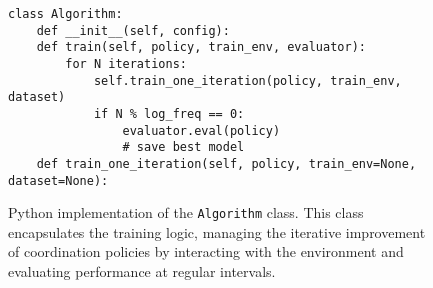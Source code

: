 \begin{figure*}[t]
\centering
\begin{tcolorbox}[title={\begin{pseudo}Algorithm Class\end{pseudo}}, colback=sbOrange025, colframe=sbOrange]
\begin{verbatim}
class Algorithm:
    def __init__(self, config):
    def train(self, policy, train_env, evaluator):
        for N iterations:
            self.train_one_iteration(policy, train_env, dataset)
            if N % log_freq == 0:
                evaluator.eval(policy)
                # save best model
    def train_one_iteration(self, policy, train_env=None, dataset=None):
\end{verbatim}
\end{tcolorbox}
\caption{Python implementation of the \texttt{Algorithm} class. This class encapsulates the training logic, managing the iterative improvement of coordination policies by interacting with the environment and evaluating performance at regular intervals.}
\label{fig:algorithm}
\end{figure*}
